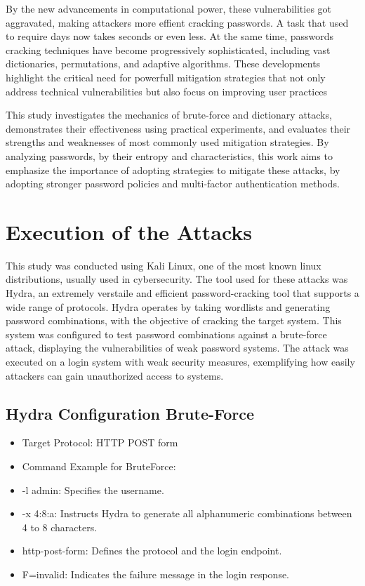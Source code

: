 \documentclass{comjnl}
\begin{document}
By the new advancements in computational power, these vulnerabilities got aggravated, making attackers more effient cracking passwords. A task that used to require days now takes seconds or even less. At the same time, passwords cracking techniques have become progressively sophisticated, including vast dictionaries, permutations, and adaptive algorithms. These developments highlight the critical need for powerfull mitigation strategies that not only address technical vulnerabilities but also focus on improving user practices 

This study investigates the mechanics of brute-force and dictionary attacks, demonstrates their effectiveness using practical experiments, and evaluates their strengths and weaknesses of most commonly used mitigation strategies. By analyzing passwords, by their entropy and characteristics, this work aims to emphasize the importance of adopting strategies to mitigate these attacks, by adopting stronger password policies and multi-factor authentication methods.

\section{Execution of the Attacks}

This study was conducted using Kali Linux, one of the most known linux distributions, usually used in cybersecurity. The tool used for these attacks was Hydra, an extremely verstaile and efficient password-cracking tool that supports a wide range of protocols. Hydra operates by taking wordlists and generating password combinations, with the objective of cracking the target system. This system was configured to test password combinations against a brute-force attack, displaying the vulnerabilities of weak password systems. The attack was executed on a login system with weak security measures, exemplifying how easily attackers can gain unauthorized access to systems. 

\subsection*{Hydra Configuration Brute-Force}
\begin{itemize}
  \item Target Protocol: HTTP POST form
  \item Command Example for BruteForce:
  \item -l admin: Specifies the username.
  \item -x 4:8:a: Instructs Hydra to generate all alphanumeric combinations between 4 to 8 characters.
  \item http-post-form: Defines the protocol and the login endpoint.
  \item F=invalid: Indicates the failure message in the login response.
\end{itemize}
\end{document}
